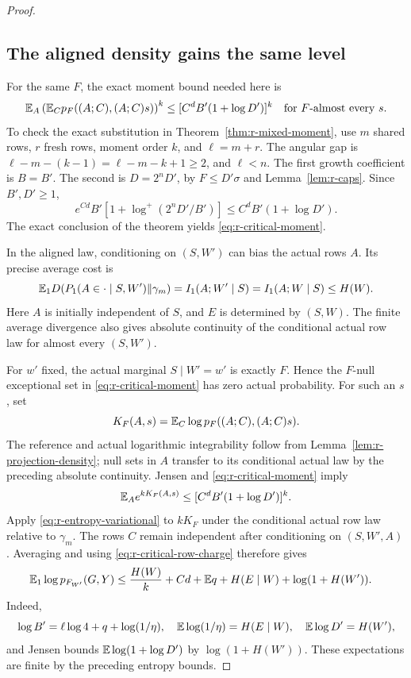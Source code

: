 \begin{proof}
\subsection*{The aligned density gains the same level}

For the same \(F\), the exact moment bound needed here is
\begin{equation}\label{eq:r-critical-moment}
 \mathbb E_A\left(\mathbb E_Cp_F((A;C),(A;C)s)\right)^k
 \le [C^dB'(1+\log D')]^k
 \quad\text{for \(F\)-almost every \(s\)}.
\end{equation}
To check the exact substitution in
Theorem~\ref{thm:r-mixed-moment}, use \(m\) shared rows, \(r\)
fresh rows, moment order \(k\), and \(\ell=m+r\).
The angular gap is
\(\ell-m-(k-1)=\ell-m-k+1\ge2\), and \(\ell<n\).
The first growth coefficient is \(B=B'\).  The second is
\(D=2^nD'\), by \(F\le D'\sigma\) and
Lemma~\ref{lem:r-caps}.  Since \(B',D'\ge1\),
\[
 e^{Cd}B'[1+\log^+(2^nD'/B')]
 \le C^dB'(1+\log D').
\]
The exact conclusion of the theorem yields
\eqref{eq:r-critical-moment}.

In the aligned law, conditioning on \((S,W')\) can bias the
actual rows \(A\).  Its precise average cost is
\begin{equation}\label{eq:r-critical-row-charge}
 \mathbb E_1D(P_1(A\in\cdot\mid S,W')\Vert\gamma_m)
 =I_1(A;W'\mid S)=I_1(A;W\mid S)\le H(W).
\end{equation}
Here \(A\) is initially independent of \(S\), and \(E\) is
determined by \((S,W)\).  The finite average divergence also
gives absolute continuity of the conditional actual row law for
almost every \((S,W')\).

For \(w'\) fixed, the actual marginal \(S\mid W'=w'\) is exactly
\(F\).  Hence the \(F\)-null exceptional set in
\eqref{eq:r-critical-moment} has zero actual probability.
For such an \(s\), set
\[
 K_F(A,s)=\mathbb E_C\log p_F((A;C),(A;C)s).
\]
The reference and actual logarithmic integrability follow from
Lemma~\ref{lem:r-projection-density}; null sets in \(A\) transfer
to its conditional actual law by the preceding absolute
continuity.  Jensen and \eqref{eq:r-critical-moment} imply
\[
 \mathbb E_A e^{kK_F(A,s)}
 \le [C^dB'(1+\log D')]^k.
\]
Apply \eqref{eq:r-entropy-variational} to \(kK_F\) under the
conditional actual row law relative to \(\gamma_m\).
The rows \(C\) remain independent after conditioning on
\((S,W',A)\).  Averaging and using \eqref{eq:r-critical-row-charge}
therefore gives
\begin{align}
 \mathbb E_1\log p_{F_{W'}}(G,Y)
 \le{}&\frac{H(W)}k+Cd+\mathbb E q+H(E\mid W)
       +\log(1+H(W')).
 \label{eq:r-critical-aligned-density}
\end{align}
Indeed,
\[
 \log B'=\ell\log4+q+\log(1/\eta),\quad
 \mathbb E\log(1/\eta)=H(E\mid W),\quad
 \mathbb E\log D'=H(W'),
\]
and Jensen bounds
\(\mathbb E\log(1+\log D')\) by \(\log(1+H(W'))\).
These expectations are finite by the preceding entropy bounds.


\end{proof}
